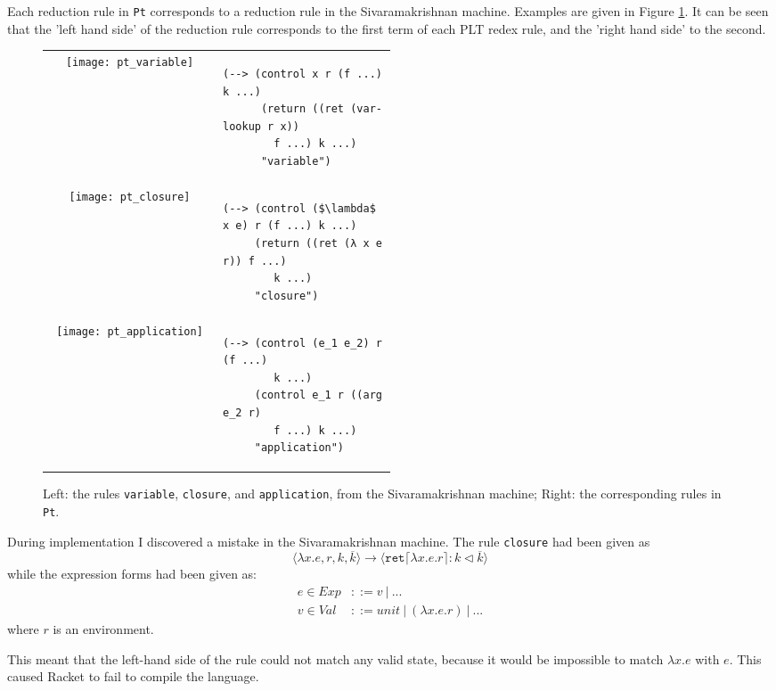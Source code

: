\documentclass[12pt,a4paper,twoside,openright]{report}
\begin{document}
Each reduction rule in \texttt{Pt} corresponds to a reduction rule in the Sivaramakrishnan machine. Examples are given in Figure \ref{fig:pt_compare}. It can be seen that the 'left hand side' of the reduction rule corresponds to the first term of each PLT redex rule, and the 'right hand side' to the second.

\begin{figure}
\centering
\caption{Left: the rules \texttt{variable}, \texttt{closure}, and \texttt{application}, from the Sivaramakrishnan machine; Right: the corresponding rules in \texttt{Pt}.}
\label{fig:pt_compare}
\begin{tabular}{c p{0.5\linewidth}}
\texttt{[image: pt\_variable]}
&
\begin{lstlisting}[xleftmargin=0pt,xrightmargin=0pt,aboveskip=0pt,belowskip=0pt]
(--> (control x r (f ...) k ...)
      (return ((ret (var-lookup r x)) 
        f ...) k ...)
      "variable")
\end{lstlisting}
\\
\texttt{[image: pt\_closure]}
&
\begin{lstlisting}[xleftmargin=0pt,xrightmargin=0pt,aboveskip=0pt,belowskip=0pt]
(--> (control ($\lambda$ x e) r (f ...) k ...)
     (return ((ret (λ x e r)) f ...) 
        k ...)
     "closure")
\end{lstlisting}
\\
\texttt{[image: pt\_application]}
&
\begin{lstlisting}[xleftmargin=0pt,xrightmargin=0pt,aboveskip=0pt,belowskip=0pt]
(--> (control (e_1 e_2) r (f ...) 
        k ...)
     (control e_1 r ((arg e_2 r) 
        f ...) k ...)
     "application")
\end{lstlisting}
\end{tabular}
\end{figure}

During implementation I discovered a mistake in the Sivaramakrishnan machine. The rule \texttt{closure} had been given as
$$\langle\lambda x.e, r, k, \overline{k} \rangle \longrightarrow \langle \texttt{ret} \lceil \lambda x.e.r \rceil : k \lhd \overline{k} \rangle$$
while the expression forms had been given as:
\begin{align} 
\nonumber e \in Exp &::= v\:  |\:  ... \\
\nonumber v \in Val &::= unit\:  |\:  (\lambda x.e.r)\:  |\:  ... 
\end{align}
where $r$ is an environment.

This meant that the left-hand side of the rule could not match any valid state, because it would be impossible to match $\lambda x.e$ with $e$. This caused Racket to fail to compile the language.
\end{document}
